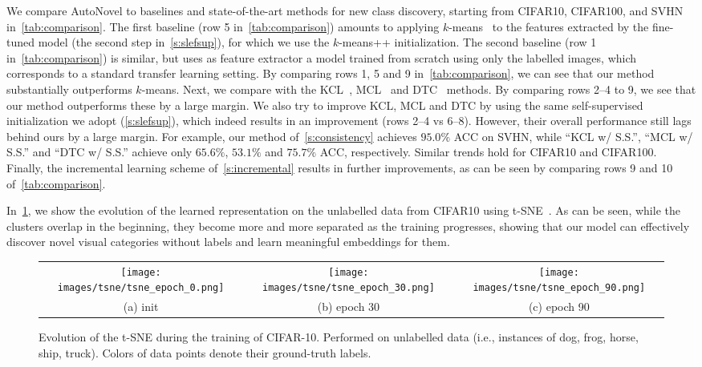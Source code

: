 We compare AutoNovel to baselines and state-of-the-art methods for new class discovery, starting from CIFAR10, CIFAR100, and SVHN in~\cref{tab:comparison}.
The first baseline (row 5 in~\cref{tab:comparison}) amounts to applying $k$-means~\cite{MackQueen67_Kmeans} to the features extracted by the fine-tuned model (the second step in~\cref{s:slefsup}), for which we use the $k$-means++ \cite{Arthur2008kmeanspp} initialization.
The second baseline (row 1 in~\cref{tab:comparison}) is similar, but uses as feature extractor a model  trained from scratch using only the labelled images, which corresponds to a standard transfer learning setting.
By comparing rows 1, 5 and 9 in~\cref{tab:comparison}, we can see that our method substantially outperforms $k$-means.
Next, we compare with the KCL~\cite{Hsu18_L2C}, MCL~\cite{Hsu19_MCL} and DTC~\cite{han2019learning} methods.
By comparing rows 2--4 to 9, we see that our method outperforms these by a large margin.
We also try to improve KCL, MCL and DTC by using the same self-supervised initialization we adopt (\cref{s:slefsup}), which indeed results in an improvement (rows 2--4 vs 6--8).
However, their overall performance still lags behind ours by a large margin.
For example, our method of~\cref{s:consistency} achieves $95.0\%$ ACC on SVHN, while ``KCL w/ S.S.'', ``MCL w/ S.S.'' and ``DTC w/ S.S.'' achieve only $65.6\%$, $53.1\%$ and $75.7\%$ ACC, respectively.
Similar trends hold for CIFAR10 and CIFAR100.
Finally, the incremental learning scheme of~\cref{s:incremental} results in further improvements, as can be seen by comparing rows 9 and 10 of~\cref{tab:comparison}.

In~\cref{fig:tsne}, we show the evolution of the learned representation on the unlabelled data from CIFAR10 using t-SNE~\cite{Maaten2008visualizing}.
As can be seen, while the clusters overlap in the beginning, they become more and more separated as the training progresses, showing that our model can effectively discover novel visual categories without labels and learn meaningful embeddings for them.

\begin{figure}[t]
\centering
\tabcolsep=0.02cm
\renewcommand{\arraystretch}{0.25}
\begin{tabular}[b]{ccc}
{\texttt{[image: images/tsne/tsne\_epoch\_0.png]}} &
{\texttt{[image: images/tsne/tsne\_epoch\_30.png]}}&
{\texttt{[image: images/tsne/tsne\_epoch\_90.png]}} \\[-0.5em]
(a) init & (b) epoch 30 & (c) epoch 90
\end{tabular}\hfill \caption{Evolution of the t-SNE during the training of CIFAR-10. Performed on unlabelled data (i.e., instances of dog, frog, horse, ship, truck).
Colors of data points denote their ground-truth labels.}\label{fig:tsne}
\end{figure}
 

